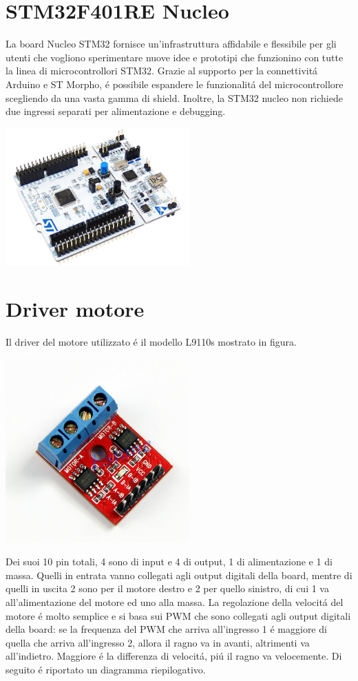 \documentclass [11pt ,a4paper ,twoside ]{report}
\begin{document}
\section{STM32F401RE Nucleo}
La board Nucleo STM32 fornisce un'infrastruttura affidabile e flessibile per gli utenti che vogliono sperimentare nuove idee e prototipi che funzionino con tutte la linea di microcontrollori STM32. Grazie al supporto per la connettivit\'a Arduino e ST Morpho, \'e possibile espandere le funzionalit\'a del microcontrollore scegliendo da una vasta gamma di shield. Inoltre, la STM32 nucleo non richiede due ingressi separati per alimentazione e debugging.
\begin{center}
\includegraphics[keepaspectratio, width=200pt]{Images/STM32.png}
\end{center}
\section{Driver motore}
Il driver del motore utilizzato \'e il modello L9110s mostrato in figura. 
\begin{center}
\includegraphics[keepaspectratio, width=200pt]{Images/motor_driver.png}
\end{center}
Dei suoi 10 pin totali, 4 sono di input e 4 di output, 1 di alimentazione e 1 di massa. Quelli in entrata vanno collegati agli output digitali della board, mentre di quelli in uscita 2 sono per il motore destro e 2 per quello sinistro, di cui 1 va all'alimentazione del motore ed uno alla massa. La regolazione della velocit\'a del motore \'e molto semplice e si basa sui PWM che sono collegati agli output digitali della board: se la frequenza del PWM  che arriva all'ingresso 1 \'e maggiore di quella che arriva all'ingresso 2, allora il ragno va in avanti, altrimenti va all'indietro. Maggiore \'e la differenza di velocit\'a, pi\'u il ragno va velocemente. Di seguito \'e riportato un diagramma riepilogativo.
\end{document}
